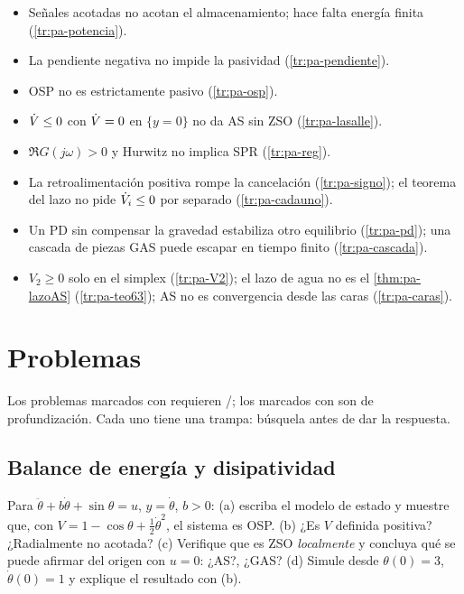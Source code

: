 \begin{trampa}[title={\faBug\hspace{0.45em}Las trampas del capítulo, en una caja}]{}
\begin{itemize}
  \item Señales acotadas no acotan el almacenamiento; hace falta energía finita (\cref{tr:pa-potencia}).
  \item La pendiente negativa no impide la pasividad (\cref{tr:pa-pendiente}).
  \item OSP no es estrictamente pasivo (\cref{tr:pa-osp}).
  \item $\dot V\le0$ con $\dot V=0$ en $\{y=0\}$ no da AS sin ZSO (\cref{tr:pa-lasalle}).
  \item $\Re G(j\omega)>0$ y Hurwitz no implica SPR (\cref{tr:pa-reg}).
  \item La retroalimentación positiva rompe la cancelación (\cref{tr:pa-signo}); el teorema del lazo no pide $\dot V_i\le0$ por separado (\cref{tr:pa-cadauno}).
  \item Un PD sin compensar la gravedad estabiliza otro equilibrio (\cref{tr:pa-pd}); una cascada de piezas GAS puede escapar en tiempo finito (\cref{tr:pa-cascada}).
  \item $V_2\ge0$ solo en el simplex (\cref{tr:pa-V2}); el lazo de agua no es el \cref{thm:pa-lazoAS} (\cref{tr:pa-teo63}); AS no es convergencia desde las caras (\cref{tr:pa-caras}).
\end{itemize}
\end{trampa}

\section{Problemas}
\label{sec:pa-problemas}

Los problemas marcados con \etiquetaM{} requieren \matlab/\simulink; los marcados con \etiquetaEstrella{} son de profundización. Cada uno tiene una trampa: búsquela antes de dar la respuesta.

\subsection*{Balance de energía y disipatividad}

\begin{problema}\label{prob:pa-pendulo}
Para $\ddot\theta+b\dot\theta+\sin\theta=u$, $y=\dot\theta$, $b>0$: (a) escriba el modelo de estado y muestre que, con $V=1-\cos\theta+\tfrac12\dot\theta^2$, el sistema es OSP. (b) ¿Es $V$ definida positiva? ¿Radialmente no acotada? (c) Verifique que es ZSO \emph{localmente} y concluya qué se puede afirmar del origen con $u=0$: ¿AS?, ¿GAS? (d) \etiquetaM{} Simule desde $\theta(0)=3$, $\dot\theta(0)=1$ y explique el resultado con (b).
\end{problema}

